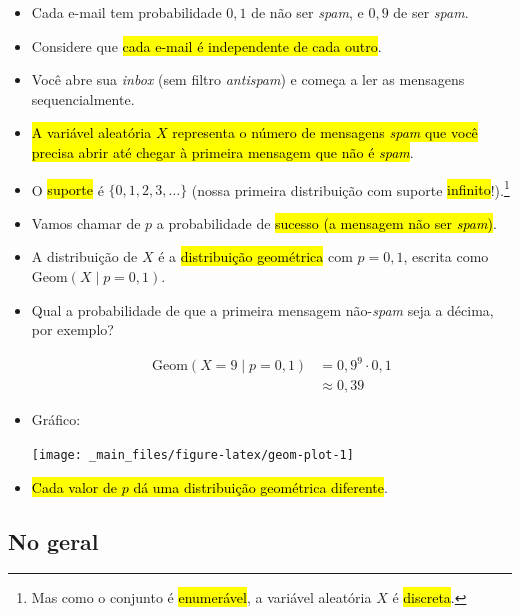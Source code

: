 \documentclass[
  11pt]{report}
\begin{document}
\begin{itemize}
\item
  Cada e-mail tem probabilidade $0{,}1$ de não ser \emph{spam}, e $0{,}9$ de ser \emph{spam}.
\item
  Considere que {\hl{cada e-mail é independente de cada outro}}.
\item
  Você abre sua \emph{inbox} (sem filtro \emph{antispam}) e começa a ler as mensagens sequencialmente.
\item
  {\hl{A variável aleatória $X$ representa o número de mensagens \emph{spam} que você precisa abrir até chegar à primeira mensagem que não é \emph{spam}}}.
\item
  O {\hl{suporte}} é $\{0, 1, 2, 3, \ldots \}$ (nossa primeira distribuição com suporte {\hl{infinito}}!).\footnote{Mas como o conjunto é {\hl{enumerável}}, a variável aleatória $X$ é {\hl{discreta}}.}
\item
  Vamos chamar de $p$ a probabilidade de {\hl{sucesso (a mensagem não ser \emph{spam})}}.
\item
  A distribuição de $X$ é a {\hl{distribuição geométrica}} com $p = 0{,}1$, escrita como $\text{Geom}(X \mid p = 0{,}1)$.
\item
  Qual a probabilidade de que a primeira mensagem não-\emph{spam} seja a décima, por exemplo?

  \[
  \begin{aligned}
  \text{Geom}(X = 9 \mid p = 0{,}1)  &= 0{,}9^9 \cdot 0{,}1 \\
                          &\approx 0{,}39 
  \end{aligned}
  \]
\item
  Gráfico:

  \begin{center}\texttt{[image: \_main\_files/figure-latex/geom-plot-1]} \end{center}
\item
  {\hl{Cada valor de $p$ dá uma distribuição geométrica diferente}}.
\end{itemize}

\hypertarget{no-geral-3}{%
\subsection{No geral}\label{no-geral-3}}
\end{document}
